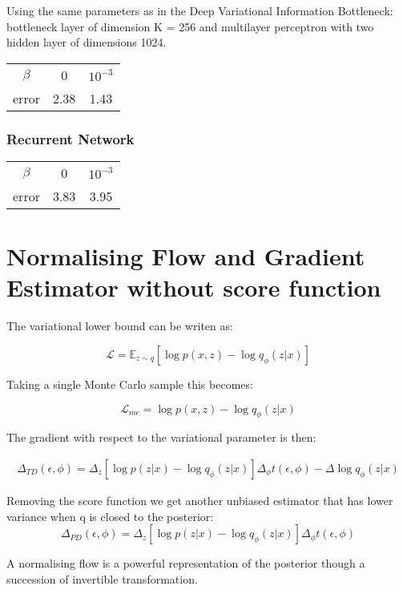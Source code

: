 \documentclass[a4paper]{article}
\begin{document}
Using the same parameters as in the Deep Variational Information Bottleneck: bottleneck layer of dimension K = 256 and multilayer perceptron with two hidden layer of dimensions 1024.

\begin{center}
\begin{tabular}{ c | c c }
 $\beta$ & 0 & $10^{-3}$ \\ 
 error &  2.38 &  1.43 \\  
\end{tabular}
\end{center}

\subsubsection{Recurrent Network}

\begin{center}
\begin{tabular}{ c | c c }
 $\beta$ & 0 & $10^{-3}$ \\ 
 error & 3.83 &  3.95 \\  
\end{tabular}
\end{center}

\section{Normalising Flow and Gradient Estimator without score function}

The variational lower bound can be writen as:

$$ \mathcal{L} = \mathbb{E}_{z \sim q}[\log p(x, z) - \log q_\phi(z|x)] $$

Taking a single Monte Carlo sample this becomes:

$$ \mathcal{L}_{mc} = \log p(x, z) - \log q_\phi(z|x) $$

The gradient with respect to the variational parameter is then:

\begin{align}
\Delta_{TD}(\epsilon, \phi) = \Delta_z[\log p(z|x) -  \log q_\phi(z|x)] \Delta_\phi t(\epsilon, \phi) - \Delta \log q_\phi(z|x)
\end{align}

Removing the score function we get another unbiased estimator that has lower variance when q is closed to the posterior:
$$ \Delta_{PD}(\epsilon, \phi) =  \Delta_z[\log p(z|x) -  \log q_\phi(z|x)] \Delta_\phi t(\epsilon, \phi)$$

A normalising flow is a powerful representation of the posterior though a succession of invertible transformation.
\end{document}
